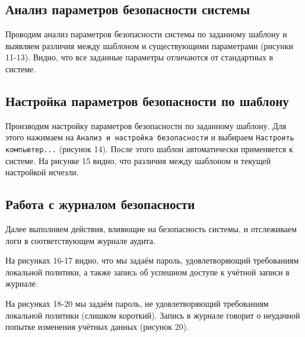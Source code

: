 \FloatBarrier

\subsection{Анализ параметров безопасности системы}
Проводим анализ параметров безопасности системы по заданному шаблону и выявляем различия между шаблоном и существующими параметрами (рисунки 11-13). Видно, что все заданные параметры отличаются от стандартных в системе.

\FloatBarrier

\subsection{Настройка параметров безопасности по шаблону}
Производим настройку параметров безопасности по заданному шаблону. Для этого нажимаем на \texttt{Анализ и настройка безопасности} и выбираем \texttt{Настроить компьютер...} (рисунок 14). После этого шаблон автоматически применяется к системе. На рисунке 15 видно, что различия между шаблоном и текущей настройкой исчезли.

\FloatBarrier

\subsection{Работа с журналом безопасности}
Далее выполняем действия, влияющие на безопасность системы, и отслеживаем логи в соответствующем журнале аудита. 

На рисунках 16-17 видно, что мы задаём пароль, удовлетворяющий требованиям локальной политики, а также запись об успешном доступе к учётной записи в журнале.

На рисунках 18-20 мы задаём пароль, не удовлетворяющий требованиям локальной политики (слишком короткий). Запись в журнале говорит о неудачной попытке изменения учётных данных (рисунок 20).
\FloatBarrier

